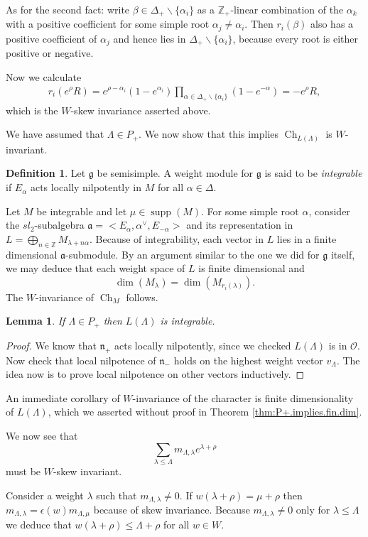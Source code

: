 \documentclass[12pt]{article}
\theoremstyle{plain}
\newtheorem{lemma}[thm]{Lemma}
\theoremstyle{definition}
\newtheorem{defn}{Definition}[section]
\numberwithin{equation}{section}
\DeclareMathOperator{\supp}{supp}
\DeclareMathOperator{\ch}{Ch}
\newcommand{\al}{\alpha}
\newcommand{\la}{\lambda}
\newcommand{\La}{\Lambda}
\newcommand{\eps}{\epsilon}
\newcommand{\D}{\Delta}
\newcommand{\Z}{\mathbb{Z}}
\newcommand{\g}{\mathfrak{g}}
\newcommand{\n}{\mathfrak{n}}
\newcommand{\OO}{\mathcal{O}}
\newcommand{\ma}{\mathfrak{a}}
\begin{document}
As for the second fact: write $\beta \in \D_+ \backslash \{\al_i\}$ as a $\Z_+$-linear combination of the $\al_k$ with a positive coefficient for some simple root $\al_j \neq \al_i$. Then $r_i(\beta)$ also has a positive coefficient of $\al_j$ and hence lies in $\D_+ \backslash \{\al_i\}$, because every root is either positive or negative.

Now we calculate
\begin{align*}
r_i(e^\rho R)
%
= e^{\rho-\al_i} (1 - e^{\al_i}) \prod_{\al \in \D_+ \backslash \{\al_i\}} (1 - e^{-\al})
%
= -e^\rho R,
\end{align*}
which is the $W$-skew invariance asserted above.

We have assumed that $\La \in P_+$. We now show that this implies $\ch_{L(\La)}$ is $W$-invariant.
\begin{defn}
Let $\g$ be semisimple. A weight module for $\g$ is said to be \emph{integrable} if $E_{\al}$ acts locally nilpotently in $M$ for all $\al \in \D$.
\end{defn}
Let $M$ be integrable and let $\mu \in \supp(M)$. For some simple root $\al$, consider the $sl_2$-subalgebra $\ma = <E_\al, \al^\vee, E_{-\al}>$ and its representation in $L = \bigoplus_{n \in \Z} M_{\la + n \al}$. Because of integrability, each vector in $L$ lies in a finite dimensional $\ma$-submodule. By an argument similar to the one we did for $\g$ itself, we may deduce that each weight space of $L$ is finite dimensional and
\[
\dim(M_\la) = \dim(M_{r_i(\la)}).
\]
The $W$-invariance of $\ch_{M}$ follows.
\begin{lemma}
If $\La \in P_+$ then $L(\La)$ is integrable.
\end{lemma}

\begin{proof}
We know that $\n_+$ acts locally nilpotently, since we checked $L(\La)$ is in $\OO$. Now check that local nilpotence of $\n_-$ holds on the highest weight vector $v_\La$. The idea now is to prove local nilpotence on other vectors inductively.
\end{proof}

An immediate corollary of $W$-invariance of the character is finite dimensionality of $L(\La)$, which we asserted without proof in Theorem \ref{thm:P+.implies.fin.dim}.

We now see that
\[
\sum_{\la \leq \La} m_{\La, \la} e^{\la+\rho}
\]
must be $W$-skew invariant.

Consider a weight $\la$ such that $m_{\La, \la} \neq 0$. If $w(\la+\rho) = \mu+\rho$ then $m_{\La, \la} = \eps(w) m_{\La, \mu}$ because of skew invariance. Because $m_{\La, \la} \neq 0$ only for $\la \leq \La$ we deduce that $w(\la+\rho) \leq \La+\rho$ for all $w \in W$.
\end{document}
